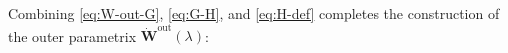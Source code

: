 Combining \eqref{eq:W-out-G}, \eqref{eq:G-H}, and \eqref{eq:H-def} completes the construction of the outer parametrix $\dot{\mathbf{W}}^\mathrm{out}(\lambda)$:
